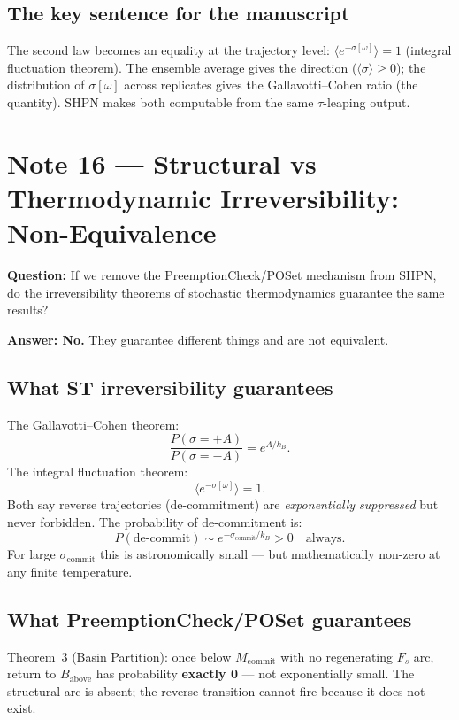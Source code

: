 \documentclass[11pt,a4paper]{article}
\begin{document}
\subsection*{The key sentence for the manuscript}

The second law becomes an equality at the trajectory level:
$\langle e^{-\sigma[\omega]} \rangle = 1$ (integral fluctuation theorem).
The ensemble average gives the direction ($\langle\sigma\rangle \geq 0$);
the distribution of $\sigma[\omega]$ across replicates gives the Gallavotti--Cohen
ratio (the quantity).  SHPN makes both computable from the same $\tau$-leaping
output.

\section*{Note 16 — Structural vs Thermodynamic Irreversibility: Non-Equivalence}
\label{note:structural_vs_thermal}

\textbf{Question:} If we remove the PreemptionCheck/POSet mechanism from
SHPN, do the irreversibility theorems of stochastic thermodynamics guarantee
the same results?

\textbf{Answer: No.}  They guarantee different things and are not equivalent.

\subsection*{What ST irreversibility guarantees}

The Gallavotti--Cohen theorem:
\[
  \frac{P(\sigma = +A)}{P(\sigma = -A)} = e^{A/k_B}.
\]
The integral fluctuation theorem:
\[
  \bigl\langle e^{-\sigma[\omega]} \bigr\rangle = 1.
\]
Both say reverse trajectories (de-commitment) are \emph{exponentially
suppressed} but never forbidden.  The probability of de-commitment is:
\[
  P(\text{de-commit}) \sim e^{-\sigma_{\text{commit}}/k_B} > 0 \quad \text{always.}
\]
For large $\sigma_{\text{commit}}$ this is astronomically small ---
but mathematically non-zero at any finite temperature.

\subsection*{What PreemptionCheck/POSet guarantees}

Theorem~3 (Basin Partition): once below $M_{\text{commit}}$ with no regenerating
$F_s$ arc, return to $B_{\text{above}}$ has probability \textbf{exactly 0} ---
not exponentially small.  The structural arc is absent; the reverse transition
cannot fire because it does not exist.
\end{document}
